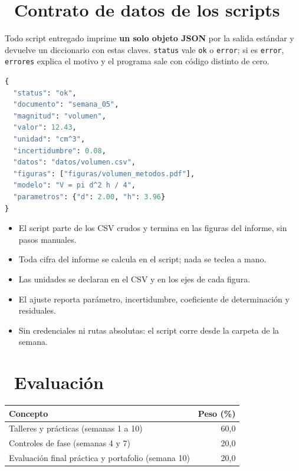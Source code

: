 \documentclass[11pt,a4paper]{article}
\newcommand{\iconotexto}[2]{\textcolor{cyanNeon}{\faIcon{#1}}~#2}
\begin{document}
\section{\iconotexto{code}{Contrato de datos de los scripts}}

\begin{cajaConcepto}Todo script entregado imprime \textbf{un solo objeto JSON} por la salida estándar y devuelve un diccionario con estas claves. \texttt{status} vale \texttt{ok} o \texttt{error}; si es \texttt{error}, \texttt{errores} explica el motivo y el programa sale con código distinto de cero.
\begin{lstlisting}[language=Python,style=estiloPython]
{
  "status": "ok",
  "documento": "semana_05",
  "magnitud": "volumen",
  "valor": 12.43,
  "unidad": "cm^3",
  "incertidumbre": 0.08,
  "datos": "datos/volumen.csv",
  "figuras": ["figuras/volumen_metodos.pdf"],
  "modelo": "V = pi d^2 h / 4",
  "parametros": {"d": 2.00, "h": 3.96}
}

\end{lstlisting}
\end{cajaConcepto}

\begin{itemize}[leftmargin=1.4em,itemsep=2pt,topsep=3pt]
  \item El script parte de los CSV crudos y termina en las figuras del informe, sin pasos manuales.
  \item Toda cifra del informe se calcula en el script; nada se teclea a mano.
  \item Las unidades se declaran en el CSV y en los ejes de cada figura.
  \item El ajuste reporta parámetro, incertidumbre, coeficiente de determinación y residuales.
  \item Sin credenciales ni rutas absolutas: el script corre desde la carpeta de la semana.
\end{itemize}

\section{\iconotexto{clipboard-check}{Evaluación}}

\begin{tabularx}{\linewidth}{@{}X r@{}}
\toprule
Concepto & Peso (\%)\\
\midrule
Talleres y prácticas (semanas 1 a 10) & 60,0 \\
Controles de fase (semanas 4 y 7) & 20,0 \\
Evaluación final práctica y portafolio (semana 10) & 20,0 \\
\bottomrule
\end{tabularx}
\end{document}
